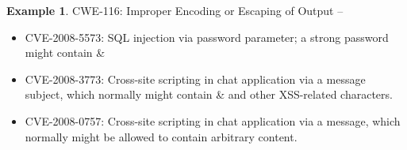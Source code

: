 \documentclass{article}
\theoremstyle{definition}
\theoremstyle{corollary}
\theoremstyle{lemma}
\theoremstyle{theorem}
\theoremstyle{theorem}
\newtheorem{example}{Example}
\begin{document}
\begin{example}{CWE-116: Improper Encoding or Escaping of Output\autocite{CWE-116} --}
\begin{itemize}
\begin{itemize}
				when sending a page to a browser, allowing for
				XSS exploitation when a browser chooses
				an unexpected encoding.
			\item CVE-2008-5573\autocite{CVE-2008-5573}: SQL injection via password
				parameter; a strong password might contain \&
			\item CVE-2008-3773\autocite{CVE-2008-3773}: Cross-site scripting in chat
				application via a message subject, which
				normally might contain \& and other
				XSS-related characters.
			\item CVE-2008-0757\autocite{CVE-2008-0757}: Cross-site scripting in chat
				application via a message, which normally might
				be allowed to contain arbitrary
				content.
			\end{itemize}
\end{itemize}


\end{example}
\end{document}
